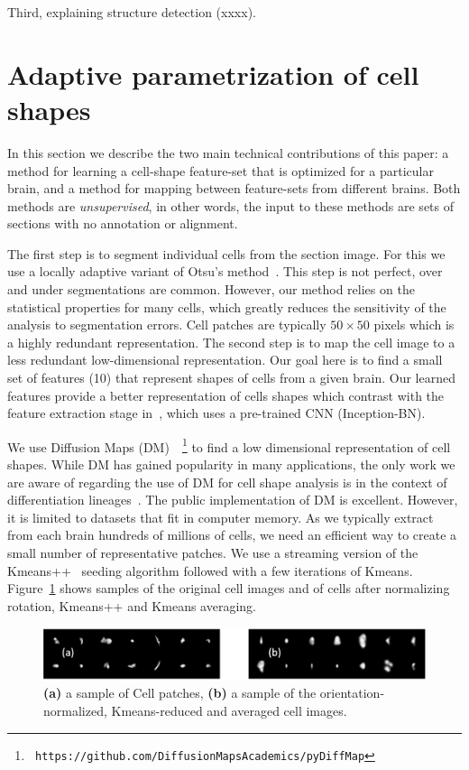 \documentclass[runningheads]{llncs}
\begin{document}
Third, explaining structure detection (xxxx).



\section{Adaptive parametrization of cell shapes}
\label{sec:DM}
In this section we describe the two main technical contributions of this
paper: a method for learning a cell-shape feature-set that is optimized
for a particular brain, and a method for mapping between feature-sets
from different brains. Both methods are {\em unsupervised}, in other
words, the input to these methods are sets of sections with no
annotation or alignment.

The first step is to segment individual cells from the section
image. For this we use a locally adaptive variant of
Otsu's method~\cite{otsu1979threshold}. This step is not perfect, over and under segmentations are
common. However, our method relies on the statistical properties for
many cells, which greatly reduces the sensitivity of the analysis to
segmentation errors. 
Cell patches are typically $50\times 50$ pixels which is a highly
redundant representation. The second step is to
map the cell image to a less redundant low-dimensional representation. Our goal here
is to find a small set of features (10) that represent shapes of cells
from a given brain. Our learned features provide a better representation 
of cells shapes which contrast with the feature extraction stage in~\cite{chen2019active}, 
which uses a pre-trained CNN (Inception-BN). 


We use Diffusion Maps
(DM)~\cite{belkin2003,coifman2005geometric}~\footnote{{\tt
    https://github.com/DiffusionMapsAcademics/pyDiffMap}} to find a
low dimensional representation of cell shapes. While DM has gained
popularity in many applications, the only work we are aware of
regarding the use of DM for cell shape analysis is in the context of
differentiation lineages~\cite{haghverdi2015diffusion}.
The public implementation of DM is excellent. However, it is limited to datasets that
fit in computer memory. As we typically extract from each brain
hundreds of millions of cells, we need an efficient way to create a
small number of representative patches.  We use a streaming version of
the Kmeans++~\cite{arthur2006k} seeding algorithm followed with a few
iterations of Kmeans. Figure~\ref{fig:kmeans} shows samples of the
original cell images and of cells after normalizing
rotation, Kmeans++ and Kmeans averaging.
\begin{figure}[t]
  \includegraphics[width=\textwidth]{Images/CellImages.png}
\caption{{\bf (a)} a sample of Cell patches,
  {\bf (b)}  a sample of the orientation-normalized, Kmeans-reduced and averaged cell images.}
\label{fig:kmeans}
\end{figure}
\end{document}
